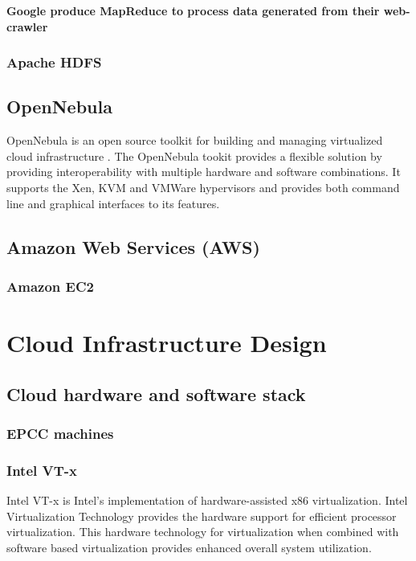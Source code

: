 \documentclass[12pt,a4paper]{report}
\begin{document}
{\bf Google produce MapReduce to process data generated from their web-crawler}

\subsection{Apache HDFS}

\section{OpenNebula}

OpenNebula is an open source toolkit for building and managing virtualized
cloud infrastructure \cite{website:one}. The OpenNebula tookit provides a flexible
solution by providing interoperability with multiple hardware and software combinations.
It supports the Xen, KVM and VMWare hypervisors and provides both command line
and graphical interfaces to its features.


\section{Amazon Web Services (AWS)}

\subsection{Amazon EC2}

\chapter{Cloud Infrastructure Design}

\section{Cloud hardware and software stack}
\subsection{EPCC machines}
\subsection{Intel VT-x}

Intel VT-x is Intel's implementation of hardware-assisted x86 virtualization.
Intel Virtualization Technology provides the hardware support for efficient processor virtualization.
This hardware technology for virtualization when combined with software based virtualization provides 
enhanced overall system utilization.\cite{website:intel-VT}
\end{document}
